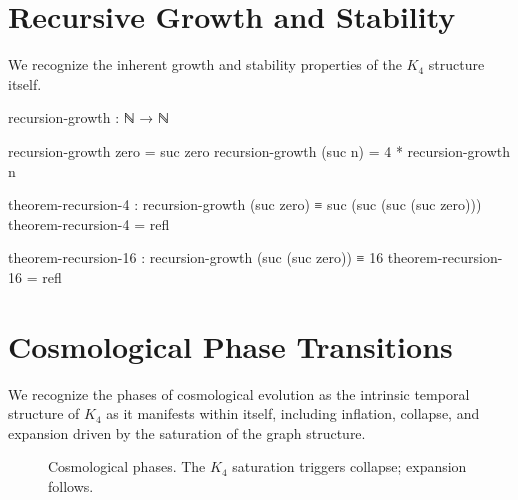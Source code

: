 \documentclass[11pt,a4paper]{book}
\begin{document}
\section{Recursive Growth and Stability}

We recognize the inherent growth and stability properties of the $K_4$ structure itself.

\begin{code}
recursion-growth : ℕ → ℕ

recursion-growth zero = suc zero
recursion-growth (suc n) = 4 * recursion-growth n

theorem-recursion-4 : recursion-growth (suc zero) ≡ suc (suc (suc (suc zero)))
theorem-recursion-4 = refl

theorem-recursion-16 : recursion-growth (suc (suc zero)) ≡ 16
theorem-recursion-16 = refl
\end{code}

\section{Cosmological Phase Transitions}

We recognize the phases of cosmological evolution as the intrinsic temporal structure of $K_4$ as it manifests within itself, including inflation, collapse, and expansion driven by the saturation of the graph structure.

\begin{figure}[h]
\centering
{}
\caption{Cosmological phases. The $K_4$ saturation triggers collapse; expansion follows.}
\label{fig:cosmological-phases}
\end{figure}
\end{document}
